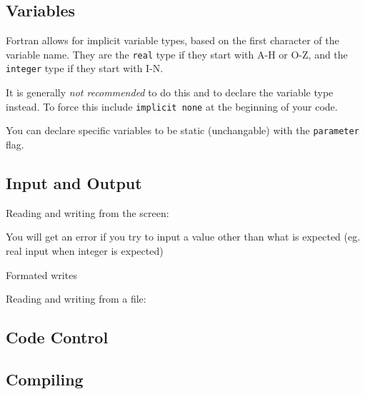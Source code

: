 \subsection{Variables}
Fortran allows for implicit variable types, based on the first character of the variable name. They are the \texttt{real} type if they start with A-H or O-Z, and the \texttt{integer} type if they start with I-N.

It is generally \emph{not recommended} to do this and to declare the variable type instead. To force this include \texttt{implicit none} at the beginning of your code.

You can declare specific variables to be static (unchangable) with the \texttt{parameter} flag.
\begin{quote}

\end{quote}



\subsection{Input and Output}
Reading and writing from the screen:
\begin{quote}

\end{quote}
You will get an error if you try to input a value other than what is expected (eg. real input when integer is expected)


Formated writes
\begin{quote}

\end{quote}


Reading and writing from a file:
\begin{quote}

\end{quote}
\subsection{Code Control}

\subsection{Compiling}



